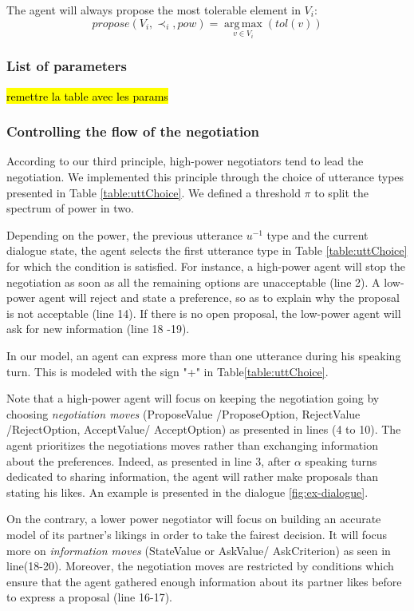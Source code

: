 \documentclass{llncs}
\begin{document}
		\noindent
		The agent will always propose the most tolerable element in $V_i$:
		\begin{equation}
			propose(V_i, \prec_i,pow) =  \operatorname*{arg\,max}_{v \in V_i} ( tol(v))
		\end{equation}

		\subsubsection*{List of parameters}

		\hl{remettre la table avec les params}

		\subsubsection{Controlling the flow of the negotiation}
		According to our third principle, high-power negotiators tend to lead the negotiation. We implemented this principle through the choice of utterance types presented in Table \ref{table:uttChoice}.		
		We defined a threshold $\pi$ to split the spectrum of power in two.
		
		Depending on the power, the previous utterance $u^{-1}$ type and the current dialogue state, the agent selects the first utterance type in Table \ref{table:uttChoice} for which the condition is satisfied. For instance, a high-power agent will stop the negotiation as soon as all the remaining options are unacceptable (line 2). A low-power agent will reject and state a preference, so as to explain why the proposal is not acceptable (line 14). If there is no open proposal, the low-power agent will ask for new information (line 18 -19).
		
		In our model, an agent can express more than one utterance during his speaking turn. This is modeled  with the sign "+" in Table\ref{table:uttChoice}.
		
		Note that a high-power agent will focus on keeping the negotiation going by choosing \emph{negotiation moves} (ProposeValue /ProposeOption, RejectValue /RejectOption, AcceptValue/ AcceptOption) as presented in lines (4 to 10). The agent prioritizes the negotiations moves rather than exchanging information about the preferences. Indeed, as presented in line 3, after $\alpha$  speaking turns dedicated to sharing information, the agent will rather make proposals than stating his likes. An example is presented in the dialogue \ref{fig:ex-dialogue}. 
		
		On the contrary, a lower power negotiator will focus on building an accurate model of its partner's likings in order to take the fairest decision. It will focus more on \emph{information moves} (StateValue or AskValue/ AskCriterion) as seen in line(18-20). Moreover, the negotiation moves are restricted by conditions which ensure that the agent gathered enough information about its partner likes before to express a proposal (line 16-17).
\end{document}
